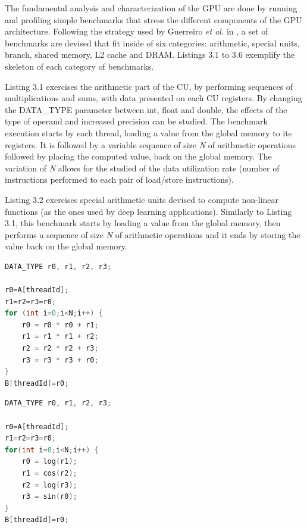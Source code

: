 The fundamental analysis and characterization of the GPU are done by running and profiling simple benchmarks that stress the different components of the GPU architecture. Following the strategy used by Guerreiro \textit{et al.} in \cite{guerreiro_gpgpu_2018} \cite{guerreiro_modeling_2019}, a set of benchmarks are devised that fit inside of six categories: arithmetic, special units, branch, shared memory, L2 cache and DRAM.  Listings 3.1 to 3.6 exemplify the skeleton of each category of benchmarks.

Listing 3.1 exercises the arithmetic part of the CU, by performing sequences of multiplications and sums, with data presented on each CU registers. By changing the DATA\_TYPE parameter between int,  float and double, the effects of the type of operand and increased precision can be studied. The benchmark execution starts by each thread, loading a value from the global memory to its registers. It is followed by a variable sequence of size \textit{N} of arithmetic operations followed by placing the computed value, back on the global memory. The variation of \textit{N} allows for the studied of the data utilization rate (number of instructions performed to each pair of load/store instructions).


Listing 3.2 exercises special arithmetic units devised to compute non-linear functions (as the ones used by deep learning applications). Similarly to Listing 3.1, this benchmark starts by loading a value from the global memory, then performs a sequence of size \textit{N} of arithmetic operations and it ends by storing the value back on the global memory.

\noindent\begin{minipage}{.45\textwidth}
\begin{lstlisting}[language=C, caption={Int, SP, DP Code}]
DATA_TYPE r0, r1, r2, r3;

r0=A[threadId]; 
r1=r2=r3=r0; 
for (int i=0;i<N;i++) { 
    r0 = r0 * r0 + r1;  
    r1 = r1 * r1 + r2; 
    r2 = r2 * r2 + r3;  
    r3 = r3 * r3 + r0; 
} 
B[threadId]=r0;
\end{lstlisting}
\end{minipage}\hfill
\begin{minipage}{.45\textwidth}
\begin{lstlisting}[language=C, caption={SF Code}]
DATA_TYPE r0, r1, r2, r3;

r0=A[threadId]; 
r1=r2=r3=r0; 
for(int i=0;i<N;i++) {  
    r0 = log(r1);  
    r1 = cos(r2);  
    r2 = log(r3);  
    r3 = sin(r0);
} 
B[threadId]=r0;
\end{lstlisting}
\end{minipage}

